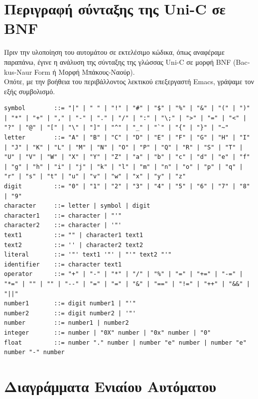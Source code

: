 \documentclass[14pt]{extarticle}
\begin{document}
\clearpage
\section{Περιγραφή σύνταξης της \textlatin{Uni-C} σε \textlatin{BNF}}
Πριν την υλοποίηση του αυτομάτου σε εκτελέσιμο κώδικα, όπως αναφέραμε παραπάνω, έγινε η ανάλυση της σύνταξης της γλώσσας \textlatin{Uni-C} σε μορφή \textlatin{BNF (Backus-Naur Form} ή Μορφή Μπάκους-Ναούρ).
\\
Οπότε, με την βοήθεια του περιβάλλοντος λεκτικού επεξεργαστή \textlatin{Emacs}, γράψαμε τον εξής συμβολισμό.   

    \begin{lstlisting}[bnf]
symbol        ::= "|" | " " | "!" | "#" | "$" | "%" | "&" | "(" | ")" | "*" | "+" | "," | "-" | "." | "/" | ":" | "\;" | ">" | "=" | "<" | "?" | "@" | "[" | "\" | "]" | "^" | "_" | "`" | "{" | "}" | "~"
letter        ::= "A" | "B" | "C" | "D" | "E" | "F" | "G" | "H" | "I" | "J" | "K" | "L" | "M" | "N" | "O" | "P" | "Q" | "R" | "S" | "T" | "U" | "V" | "W" | "X" | "Y" | "Z" | "a" | "b" | "c" | "d" | "e" | "f" | "g" | "h" | "i" | "j" | "k" | "l" | "m" | "n" | "o" | "p" | "q" | "r" | "s" | "t" | "u" | "v" | "w" | "x" | "y" | "z"
digit         ::= "0" | "1" | "2" | "3" | "4" | "5" | "6" | "7" | "8" | "9"
character     ::= letter | symbol | digit
character1    ::= character | "'"
character2    ::= character | '"'
text1         ::= "" | character1 text1
text2         ::= '' | character2 text2
literal       ::= '"' text1 '"' | "'" text2 "'"
identifier    ::= character text1
operator      ::= "+" | "-" | "*" | "/" | "%" | "=" | "+=" | "-=" | "*=" | "" | "" | "--" | "=" | "=" | "&" | "==" | "!=" | "++" | "&&" | "||"
number1       ::= digit number1 | "'"
number2       ::= digit number2 | '"'
number        ::= number1 | number2
integer       ::= number | "0X" number | "0x" number | "0"  
float         ::= number "." number | number "e" number | number "e" number "-" number
    \end{lstlisting}



\clearpage
\section{Διαγράμματα Ενιαίου Αυτόματου}
\end{document}
